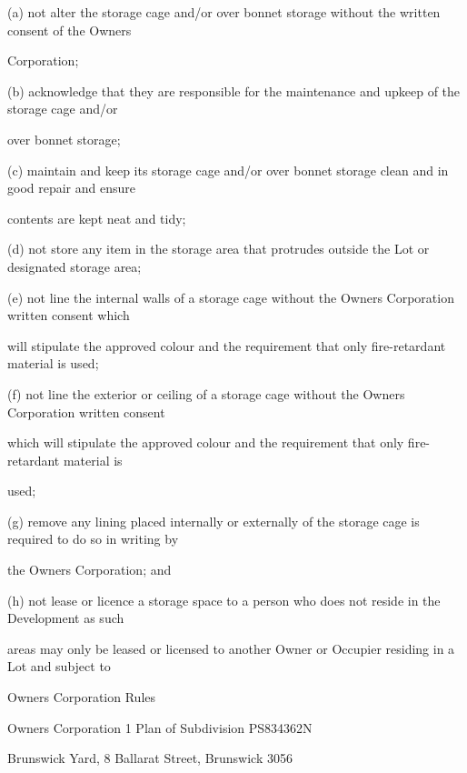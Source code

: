\documentclass{article}
\begin{document}
{\fontsize{9.962}{1}(a) not alter the storage cage and/or over bonnet storage without the written consent of the Owners }

{\fontsize{10.02}{1}Corporation; }

{\fontsize{9.962}{1}(b) acknowledge that they are responsible for the maintenance and upkeep of the storage cage and/or }

{\fontsize{10.02}{1}over bonnet storage; }

{\fontsize{9.962}{1}(c) maintain and keep its storage cage and/or over bonnet storage clean and in good repair and ensure }

{\fontsize{10.02}{1}contents are kept neat and tidy; }

{\fontsize{9.962}{1}(d) not store any item in the storage area that protrudes outside the Lot or designated storage area; }

{\fontsize{9.962}{1}(e) not line the internal walls of a storage cage without the Owners Corporation written consent which }

{\fontsize{10.02}{1}will stipulate the approved colour and the requirement that only fire-retardant material is used; }

{\fontsize{9.962}{1}(f) not line the exterior or ceiling of a storage cage without the Owners Corporation written consent }

{\fontsize{10.02}{1}which will stipulate the approved colour and the requirement that only fire-retardant material is }

{\fontsize{10.02}{1}used; }

{\fontsize{9.962}{1}(g) remove any lining placed internally or externally of the storage cage is required to do so in writing by }

{\fontsize{10.02}{1}the Owners Corporation; and }

{\fontsize{9.962}{1}(h) not lease or licence a storage space to a person who does not reside in the Development as such }

{\fontsize{10.02}{1}areas may only be leased or licensed to another Owner or Occupier residing in a Lot and subject to }

\newpage





{\fontsize{9}{1}Owners Corporation Rules }

{\fontsize{9}{1}Owners Corporation 1 Plan of Subdivision PS834362N }

{\fontsize{9}{1}Brunswick Yard, 8 Ballarat Street, Brunswick 3056 }
\end{document}
